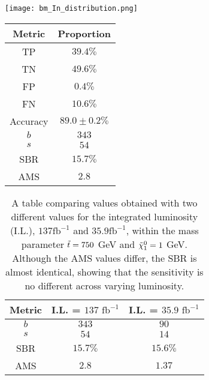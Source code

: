 \noindent\begin{minipage}{\textwidth}
  \centering
  \begin{minipage}[htbp]{0.6\textwidth}
    \centering
    \texttt{[image: bm\_In\_distribution.png]}
    \label{fig:dist_bm_in}
  \end{minipage}
  \hfill
  \begin{minipage}[htbp]{0.39\textwidth}
        \centering
        \begin{tabular}{c|c} 
        \toprule
        Metric & Proportion \\
        \midrule
        \rowcolor{gray!6} TP & $39.4 \%$ \\
        TN & $49.6 \%$ \\
        \rowcolor{gray!6} FP & $0.4 \%$\\
        FN & $10.6 \%$ \\
        \rowcolor{gray!6} Accuracy & $89.0 \pm 0.2 \%$ \\
        \midrule
        $b$ & $343$ \\
        \rowcolor{gray!6} $s$ & $54$ \\
        SBR & $15.7\%$\\
        \rowcolor{gray!6} AMS & $2.8$ \\
        \bottomrule
        \end{tabular}
        \label{tab:Values_in}
    \end{minipage}
\end{minipage}

\begin{table}[htbp]
    \centering
    \begin{tabular}{c||c|c}
        \toprule
        Metric & I.L. = $137\text{ fb}^{-1}$ & I.L. = $35.9\text{ fb}^{-1}$ \\
        \midrule
        \rowcolor{gray!6} $b$ & $343$ & $90$ \\
        $s$ & $54$ & $14$\\
        \rowcolor{gray!6} SBR & $15.7\%$ & $15.6\%$\\
        AMS & $2.8$ & $1.37$ \\
        \bottomrule
    \end{tabular}
    \caption{A table comparing values obtained with two different values for the integrated luminosity (I.L.), $137\text{fb}^{-1}$ and $35.9\text{fb}^{-1}$, within the mass parameter $\Tilde{t} = 750$ GeV and $\Tilde{\chi}_1^0 = 1$ GeV. Although the AMS values differ, the SBR is almost identical, showing that the sensitivity is no different across varying luminosity.}
    \label{tab:valsComp}
\end{table}

